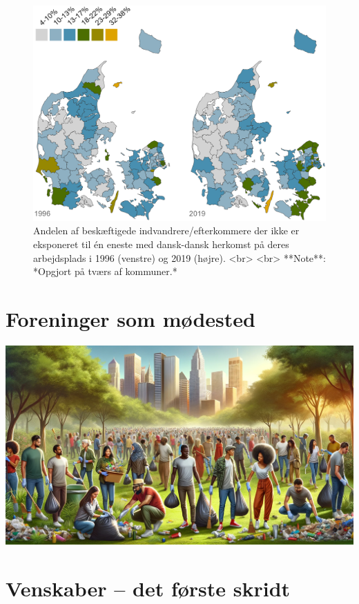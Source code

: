 \documentclass[
]{book}
\begin{document}
\begin{figure}
\includegraphics[width=1\linewidth]{images/Figur_4_5} \caption{Andelen af beskæftigede indvandrere/efterkommere der ikke er eksponeret til én eneste med dansk-dansk herkomst på deres arbejdsplads i 1996 (venstre) og 2019 (højre). <br> <br> **Note**: *Opgjort på tværs af kommuner.*}\label{fig:fig-4-5}
\end{figure}

\chapter{Foreninger som mødested}\label{kap5}

\includegraphics[width=1\linewidth]{images/dalle-civil}

\chapter{Venskaber -- det første skridt}\label{kap6}
\end{document}
